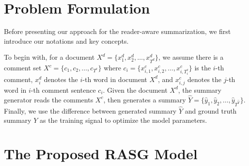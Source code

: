 \documentclass[letterpaper]{article} %
\begin{document}
    
\section{Problem Formulation}
\label{sec:formulation}

Before presenting our approach for the reader-aware summarization, we first introduce our notations and key concepts. 


To begin with, for a document $X^d=\{x^d_1, x^d_2, \dots, x^d_{T^d}\}$, we assume there is a comment set $X^c=\{c_1, c_2, \dots, c_{T^c}\}$ where $c_i = \{x^c_{i,1}, x^c_{i,2}, \dots, x^c_{i,T^c_{i}}\}$ is the $i$-th comment, $x^d_i$ denotes the $i$-th word in document $X^d$, and $x^c_{i,j}$ denotes the $j$-th word in $i$-th comment sentence $c_i$.
Given the document $X^d$, the summary generator reads the comments $X^c$, then generates a summary $\hat{Y} = \{\hat{y}_1, \hat{y}_2, \dots, \hat{y}_{T^{\hat{Y}}}\}$.
Finally, we use the difference between generated summary $\hat{Y}$ and ground truth summary $Y$ as the training signal to optimize the model parameters.

\section{The Proposed RASG Model}
\end{document}
